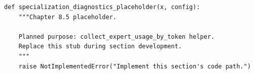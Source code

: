 \begin{lstlisting}[style=bookpython,caption={Planned code placeholder for specialization diagnostics.},label={lst:ch08-specialization-diagnostics}]
def specialization_diagnostics_placeholder(x, config):
    """Chapter 8.5 placeholder.

    Planned purpose: collect_expert_usage_by_token helper.
    Replace this stub during section development.
    """
    raise NotImplementedError("Implement this section's code path.")
\end{lstlisting}

